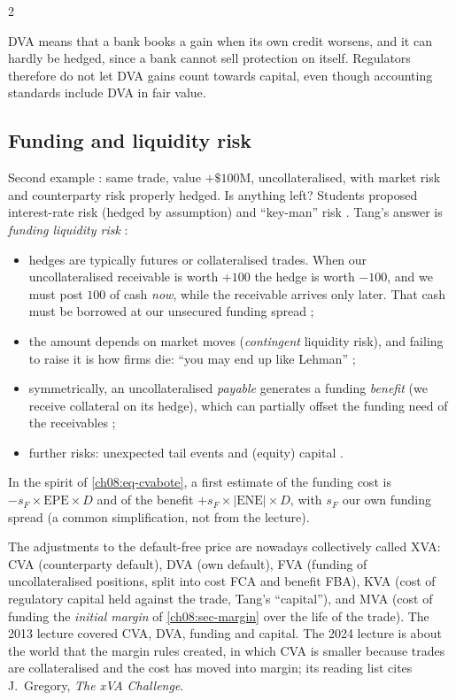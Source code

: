 \begin{paracol}{2}
\begin{finance}
DVA means that a bank books a gain when its own credit worsens, and it can hardly be hedged, since a bank cannot
sell protection on itself. Regulators therefore do not let DVA gains count towards capital, even though
accounting standards include DVA in fair value.
\end{finance}

\subsection{Funding and liquidity risk}
Second example : same trade, value $+\$100$M, uncollateralised, with market risk and counterparty
risk properly hedged. Is anything left? Students proposed interest-rate risk (hedged by assumption) and
``key-man'' risk . Tang's answer is \emph{funding liquidity risk} :
\begin{itemize}
  \item hedges are typically futures or collateralised trades. When our uncollateralised receivable is worth
        $+100$ the hedge is worth $-100$, and we must post $100$ of cash \emph{now}, while the receivable
        arrives only later. That cash must be borrowed at our unsecured funding spread ;
  \item the amount depends on market moves (\emph{contingent} liquidity risk), and failing to raise it is how
        firms die: ``you may end up like Lehman'' ;
  \item symmetrically, an uncollateralised \emph{payable} generates a funding \emph{benefit} (we receive
        collateral on its hedge), which can partially offset the funding need of the receivables
        ;
  \item further risks: unexpected tail events and (equity) capital .
\end{itemize}
In the spirit of \eqref{ch08:eq-cvabote}, a first estimate of the funding cost is $-s_F\times\mathrm{EPE}\times D$
and of the benefit $+s_F\times|\mathrm{ENE}|\times D$, with $s_F$ our own funding spread (a common simplification,
not from the lecture).

\begin{finance}
The adjustments to the default-free price are nowadays collectively called XVA: CVA (counterparty default),
DVA (own default), FVA (funding of uncollateralised positions, split into cost FCA and benefit FBA), KVA (cost
of regulatory capital held against the trade, Tang's ``capital''), and MVA (cost of funding the \emph{initial
margin} of \cref{ch08:sec-margin} over the life of the trade). The 2013 lecture covered CVA, DVA, funding and
capital. The 2024 lecture is about the world that the margin rules created, in which CVA is smaller because
trades are collateralised and the cost has moved into margin; its reading list cites J.~Gregory, \emph{The xVA
Challenge}.
\end{finance}


\end{paracol}
